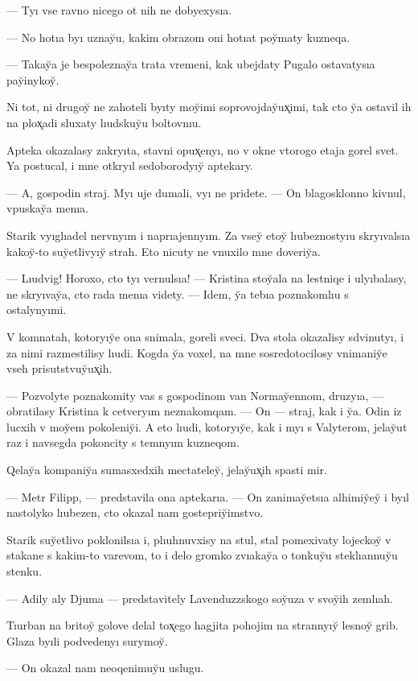\documentclass[10pt]{book}
\begin{document}
— Tyı vse ravno nicego ot nih ne dobyexysıa.

— No hotıa byı uznay̆u, kakim obrazom oni hotıat poy̆maty kuzneqa.

— Takay̆a je bespoleznay̆a trata vremeni, kak ubejdaty Pugalo ostavatysıa pay̆inykoy̆.

Ni tot, ni drugoy̆ ne zahoteli byıty moy̆imi soprovojday̆ux̨imi, tak cto y̆a ostavil ih na plox̨adi sluxaty lıudskuy̆u boltovnıu.

Apteka okazalasy zakryıta, stavni opux̨enyı, no v okne vtorogo etaja gorel svet. Ya postucal, i mne otkryıl sedoborodyıy̆ aptekary.

— A, gospodin straj. Myı uje dumali, vyı ne pridete. — On blagosklonno kivnul, vpuskay̆a menıa.

Starik vyıglıadel nervnyım i naprıajennyım. Za vsey̆ etoy̆ lıubeznostyıu skryıvalsıa kakoy̆-to suy̆etlivyıy̆ strah. Eto nicuty ne vnuxilo mne doveriy̆a.

— Lıudvig! Horoxo, cto tyı vernulsıa! — Kristina stoy̆ala na lestniqe i ulyıbalasy, ne skryıvay̆a, cto rada menıa videty. — Idem, y̆a tebıa poznakomlıu s ostalynyımi.

V komnatah, kotoryıy̆e ona snimala, goreli sveci. Dva stola okazalisy sdvinutyı, i za nimi razmestilisy lıudi. Kogda y̆a voxel, na mne sosredotocilosy vnimaniy̆e vseh prisutstvuy̆ux̨ih.

— Pozvolyte poznakomity vas s gospodinom van Normay̆ennom, druzyıa, — obratilasy Kristina k cetveryım neznakomqam. — On — straj, kak i y̆a. Odin iz lucxih v moy̆em pokoleniy̆i. A eto lıudi, kotoryıy̆e, kak i myı s Valyterom, jelay̆ut raz i navsegda pokoncity s temnyım kuzneqom.

Qelay̆a kompaniy̆a sumasxedxih mectateley̆, jelay̆ux̨ih spasti mir.

— Metr Filipp, — predstavila ona aptekarıa. — On zanimay̆etsıa alhimiy̆ey̆ i byıl nastolyko lıubezen, cto okazal nam gostepriy̆imstvo.

Starik suy̆etlivo poklonilsıa i, plıuhnuvxisy na stul, stal pomexivaty lojeckoy̆ v stakane s kakim-to varevom, to i delo gromko zvıakay̆a o tonkuy̆u steklıannuy̆u stenku.

— Adily aly Djuma — predstavitely Lavenduzzskogo soy̆uza v svoy̆ih zemlıah.

Tıurban na britoy̆ golove delal tox̨ego hagjita pohojim na strannyıy̆ lesnoy̆ grib. Glaza byıli podvedenyı surymoy̆.

— On okazal nam neoqenimuy̆u uslugu.
\end{document}

